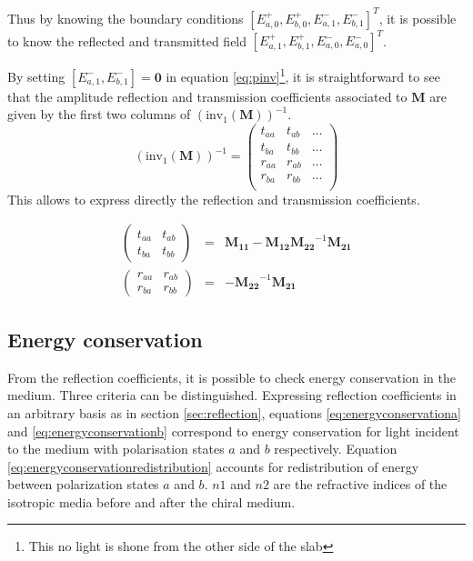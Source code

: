 Thus by knowing the boundary conditions $[E_{a,0}^+, E_{b,0}^+, E_{a,1}^-, E_{b,1}^-]^T$, it is possible to know the reflected and transmitted field $[E_{a,1}^+,E_{b,1}^+,E_{a,0}^-,E_{a,0}^-]^T$. 

By setting $[E_{a,1}^-, E_{b,1}^-] = \bm{0}$ in equation \ref{eq:pinv}\footnote{This no light is shone from the other side of the slab}, it is straightforward to see that the amplitude reflection and transmission coefficients associated to $\bm{M}$ are given by the first two columns of $\left(\text{inv}_1(\bm{M})\right)^{-1}$.
\begin{equation}
\left(\text{inv}_1(\bm{M})\right)^{-1} = \begin{pmatrix}
t_{aa} & t_{ab} & \ldots \\
t_{ba} & t_{bb} & \ldots \\
r_{aa} & r_{ab} & \ldots \\
r_{ba} & r_{bb} &  \ldots\\
\end{pmatrix}
\end{equation}
%
This allows to express directly the reflection and transmission coefficients.

\begin{eqnarray}
\begin{pmatrix}
t_{aa} & t_{ab} \\
t_{ba} & t_{bb}
\end{pmatrix} &=& \bm{M_{11}} - \bm{M_{12}}\bm{M_{22}}^{-1}\bm{M_{21}} \label{eq:transmission}\\
\begin{pmatrix}
r_{aa} & r_{ab} \\
r_{ba} & r_{bb}
\end{pmatrix} &=& -\bm{M_{22}}^{-1}\bm{M_{21}}\label{eq:reflection}
\end{eqnarray}

\subsection{Energy conservation}

From the reflection coefficients, it is possible to check energy conservation in the medium. Three criteria can be distinguished\cite{mccall_properties_2009}.  Expressing reflection coefficients in an arbitrary basis as in section \ref{sec:reflection}, equations \ref{eq:energyconservationa} and \ref{eq:energyconservationb} correspond to energy conservation for light incident to the medium with polarisation states $a$ and $b$ respectively. Equation \ref{eq:energyconservationredistribution} accounts for redistribution of energy between polarization states $a$ and $b$. $n1$ and $n2$ are the refractive indices of the isotropic media before and after the chiral medium.

